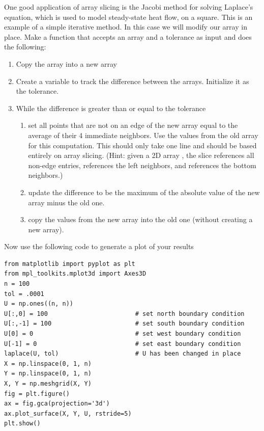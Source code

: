 \begin{problem}
One good application of array slicing is the Jacobi method for solving Laplace's 
equation, which is used to model steady-state heat flow, on a square.
This is an example of a simple iterative method.
In this case we will modify our array in place.
Make a function that accepts an array and a tolerance as input and does the following:
\begin{enumerate}
\item Copy the array into a new array
\item Create a variable to track the difference between the arrays.
Initialize it as the tolerance.
\item While the difference is greater than or equal to the tolerance
\begin{enumerate}
	\item set all points that are not on an edge of the new array equal to the average of 
    their 4 immediate neighbors.
    Use the values from the old array for this computation.
    This should only take one line and should be based entirely on array slicing.
    (Hint: given a 2D array , the slice  references all non-edge 
    entries,  references the left neighbors, and  
    references the bottom neighbors.)
	\item update the difference to be the maximum of the absolute value of the new array minus the old one.
	\item copy the values from the new array into the old one (without creating a new array).
\end{enumerate}
\end{enumerate}

Now use the following code to generate a plot of your results
\begin{lstlisting}
from matplotlib import pyplot as plt
from mpl_toolkits.mplot3d import Axes3D
n = 100
tol = .0001
U = np.ones((n, n))
U[:,0] = 100                        # set north boundary condition
U[:,-1] = 100                       # set south boundary condition
U[0] = 0                            # set west boundary condition
U[-1] = 0                           # set east boundary condition
laplace(U, tol)                     # U has been changed in place
X = np.linspace(0, 1, n)
Y = np.linspace(0, 1, n)
X, Y = np.meshgrid(X, Y)
fig = plt.figure()
ax = fig.gca(projection='3d')
ax.plot_surface(X, Y, U, rstride=5)
plt.show()
\end{lstlisting}


\end{problem}

